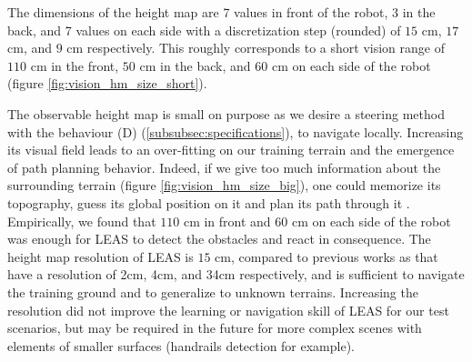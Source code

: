 The dimensions of the height map are 7 values in front of the robot, 3 in the back, and 7 values on each side with a discretization step (rounded) of $15$ cm, $17$ cm, and $9$ cm respectively. This roughly corresponds to a short vision range of $110$ cm in the front, $50$ cm in the back, and $60$ cm on each side of the robot (figure \ref{fig:vision_hm_size_short}).

The observable height map is small on purpose as we desire a steering method with the behaviour (D) (\ref{subsubsec:specifications}), to navigate locally. Increasing its visual field leads to an over-fitting on our training terrain and the emergence of path planning behavior.
Indeed, if we give too much information about the surrounding terrain (figure \ref{fig:vision_hm_size_big}), one could memorize its topography, guess its global position on it and plan its path through it \cite{rl_navigation_video_game_2020}.
Empirically, we found that $110$ cm in front and $60$ cm on each side of the robot was enough for LEAS to detect the obstacles and react in consequence.
The height map resolution of LEAS is $15$ cm, compared to previous works as \cite{RLOC, deepGait, deepLoco} that have a resolution of 2cm, 4cm, and 34cm respectively, and is sufficient to navigate the training ground and to generalize to unknown terrains. 
Increasing the resolution did not improve the learning or navigation skill of LEAS for our test scenarios, but may be required in the future for more complex scenes with elements of smaller surfaces (handrails detection for example).

